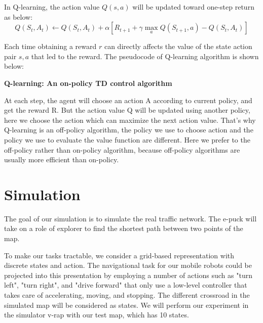 \documentclass[a4paper, 11pt]{article} %
\begin{document}
In Q-learning, the action value $Q(s,a)$ will be updated toward one-step return as below:$$Q(S_t,A_t)\leftarrow Q(S_t,A_t)+ \alpha [ R_{t+1} + \gamma \max \limits_{a}Q(S_{t+1},a)-Q(S_t,A_t)]$$

Each time obtaining a reward $r$ can directly affects the value of the state action pair $s,a$ that led to the reward. The pseudocode of Q-learning algorithm is shown below:
\begin{center}\textbf{Q-learning: An on-policy TD control algorithm}


\end{center}

At each step, the agent will choose an action A according to current policy, and get the reward R. But the action value Q will be updated using another policy, here we choose the action which can maximize the next action value. That's why Q-learning is an off-policy algorithm, the policy we use to choose action and the policy we use to evaluate the value function are different. Here we prefer to the off-policy rather than on-policy algorithm, because off-policy algorithms are usually more efficient than on-policy.

\section{Simulation}
The goal of our simulation is to simulate the real traffic network. The e-puck will take on a role of explorer to find the shortest path between two points of the map.

To make our tasks tractable, we consider a grid-based representation with discrete states and action. The navigational task for our mobile robots could be projected into this presentation by employing a number of actions such as "turn left", "turn right", and "drive forward" that only use a low-level controller that takes care of accelerating, moving, and stopping. The different crossroad in the simulated map will be considered as states. We will perform our experiment in the simulator v-rap with our test map, which has 10 states.
\end{document}
